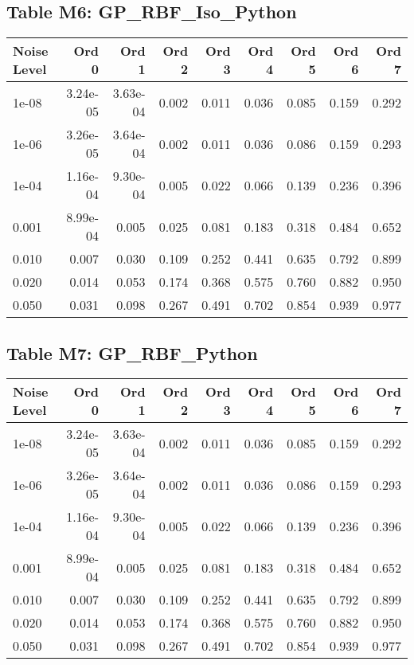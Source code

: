 \documentclass[10pt]{article}
\begin{document}
\clearpage

\subsection*{Table M6: GP\_RBF\_Iso\_Python}

\begin{longtable}{lrrrrrrrr}
\toprule
\textbf{Noise Level} & \textbf{Ord 0} & \textbf{Ord 1} & \textbf{Ord 2} & \textbf{Ord 3} & \textbf{Ord 4} & \textbf{Ord 5} & \textbf{Ord 6} & \textbf{Ord 7} \\
\midrule
\endhead
1e-08 & 3.24e-05 & 3.63e-04 & 0.002 & 0.011 & 0.036 & 0.085 & 0.159 & 0.292 \\
1e-06 & 3.26e-05 & 3.64e-04 & 0.002 & 0.011 & 0.036 & 0.086 & 0.159 & 0.293 \\
1e-04 & 1.16e-04 & 9.30e-04 & 0.005 & 0.022 & 0.066 & 0.139 & 0.236 & 0.396 \\
0.001 & 8.99e-04 & 0.005 & 0.025 & 0.081 & 0.183 & 0.318 & 0.484 & 0.652 \\
0.010 & 0.007 & 0.030 & 0.109 & 0.252 & 0.441 & 0.635 & 0.792 & 0.899 \\
0.020 & 0.014 & 0.053 & 0.174 & 0.368 & 0.575 & 0.760 & 0.882 & 0.950 \\
0.050 & 0.031 & 0.098 & 0.267 & 0.491 & 0.702 & 0.854 & 0.939 & 0.977 \\
\bottomrule
\end{longtable}

\clearpage

\subsection*{Table M7: GP\_RBF\_Python}

\begin{longtable}{lrrrrrrrr}
\toprule
\textbf{Noise Level} & \textbf{Ord 0} & \textbf{Ord 1} & \textbf{Ord 2} & \textbf{Ord 3} & \textbf{Ord 4} & \textbf{Ord 5} & \textbf{Ord 6} & \textbf{Ord 7} \\
\midrule
\endhead
1e-08 & 3.24e-05 & 3.63e-04 & 0.002 & 0.011 & 0.036 & 0.085 & 0.159 & 0.292 \\
1e-06 & 3.26e-05 & 3.64e-04 & 0.002 & 0.011 & 0.036 & 0.086 & 0.159 & 0.293 \\
1e-04 & 1.16e-04 & 9.30e-04 & 0.005 & 0.022 & 0.066 & 0.139 & 0.236 & 0.396 \\
0.001 & 8.99e-04 & 0.005 & 0.025 & 0.081 & 0.183 & 0.318 & 0.484 & 0.652 \\
0.010 & 0.007 & 0.030 & 0.109 & 0.252 & 0.441 & 0.635 & 0.792 & 0.899 \\
0.020 & 0.014 & 0.053 & 0.174 & 0.368 & 0.575 & 0.760 & 0.882 & 0.950 \\
0.050 & 0.031 & 0.098 & 0.267 & 0.491 & 0.702 & 0.854 & 0.939 & 0.977 \\
\bottomrule
\end{longtable}
\end{document}
